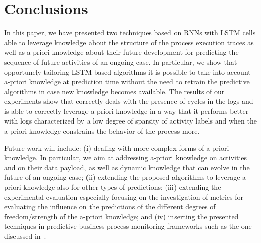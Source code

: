 
\section{Conclusions} %
\label{sec:conclusions}

In this paper, we have presented two techniques based on RNNs with LSTM cells able to leverage knowledge about the structure of the process execution traces as well as a-priori knowledge about their future development for predicting the sequence of future activities of an ongoing case. In particular, we show that opportunely tailoring LSTM-based algorithms it is possible to take into account a-priori knowledge at prediction time without the need to retrain the predictive algorithms in case new knowledge becomes available. The results of our experiments show that \nocycle correctly deals with the presence of cycles in the logs and \protrack is able to correctly leverage a-priori knowledge in a way that it performs better with logs characterized by a low degree of sparsity of activity labels and when the a-priori knowledge constrains the behavior of the process more.

Future work will include: (i) dealing with more complex forms of a-priori knowledge. In particular, we aim at addressing a-priori knowledge on activities and on their data payload, as well as dynamic knowledge that can evolve in the future of an ongoing case; (ii) extending the proposed algorithms to leverage a-priori knowledge also for other types of predictions; (iii) extending the experimental evaluation especially focusing on the investigation of metrics for evaluating the influence on the predictions of the different degrees of freedom/strength of the a-priori knowledge; and (iv) inserting the presented techniques in predictive business process monitoring frameworks such as the one discussed in~\cite{Di-Francescomarino:2016aa}.

